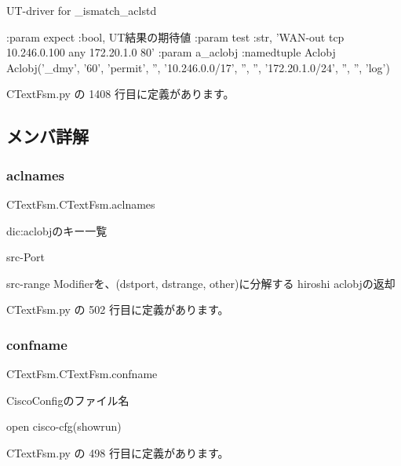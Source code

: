 \begin{DoxyVerb}UT-driver for _ismatch_aclstd

:param expect   :bool, UT結果の期待値
:param test     :str, 'WAN-out tcp 10.246.0.100 any 172.20.1.0 80'
:param a_aclobj :namedtuple Aclobj
  Aclobj('_dmy', '60', 'permit', '', '10.246.0.0/17', '', '', '172.20.1.0/24', '', '', 'log')
\end{DoxyVerb}
 

 C\+Text\+Fsm.\+py の 1408 行目に定義があります。



\subsection{メンバ詳解}
\mbox{\label{classCTextFsm_1_1CTextFsm_ae4a6e9fb950ddd34ce0078bbbce4bb61}} 
\subsubsection{\texorpdfstring{aclnames}{aclnames}}
{\footnotesize\ttfamily C\+Text\+Fsm.\+C\+Text\+Fsm.\+aclnames}



dic\+:aclobjのキー一覧 

src-\/\+Port

src-\/range Modifierを、(dstport, dstrange, other)に分解する hiroshi aclobjの返却 

 C\+Text\+Fsm.\+py の 502 行目に定義があります。

\mbox{\label{classCTextFsm_1_1CTextFsm_afaf1b7c90c7fc6173ecc700966132c5c}} 
\subsubsection{\texorpdfstring{confname}{confname}}
{\footnotesize\ttfamily C\+Text\+Fsm.\+C\+Text\+Fsm.\+confname}



Cisco\+Configのファイル名 

open cisco-\/cfg(showrun) 

 C\+Text\+Fsm.\+py の 498 行目に定義があります。

